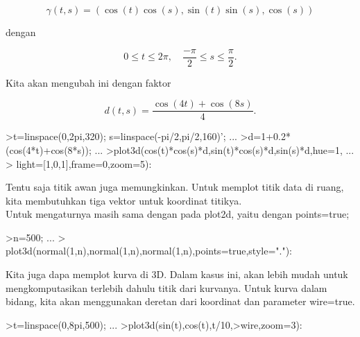 \documentclass{article}
\begin{document}
\begin{eulernotebook}
\begin{eulercomment}
\end{eulercomment}
\begin{eulerformula}
\[
\gamma(t,s) = (\cos(t)\cos(s),\sin(t)\sin(s),\cos(s))
\]
\end{eulerformula}
\begin{eulercomment}
dengan

\end{eulercomment}
\begin{eulerformula}
\[
0 \le t \le 2\pi, \quad \frac{-\pi}{2} \le s \le \frac{\pi}{2}.
\]
\end{eulerformula}
\begin{eulercomment}
Kita akan mengubah ini dengan faktor

\end{eulercomment}
\begin{eulerformula}
\[
d(t,s) = \frac{\cos(4t)+\cos(8s)}{4}.
\]
\end{eulerformula}
\begin{eulerprompt}
>t=linspace(0,2pi,320); s=linspace(-pi/2,pi/2,160)'; ...
>d=1+0.2*(cos(4*t)+cos(8*s)); ...
>plot3d(cos(t)*cos(s)*d,sin(t)*cos(s)*d,sin(s)*d,hue=1, ...
>  light=[1,0,1],frame=0,zoom=5):
\end{eulerprompt}
\begin{eulercomment}
Tentu saja titik awan juga memungkinkan. Untuk memplot titik data di
ruang, kita membutuhkan tiga vektor untuk koordinat titikya.\\
Untuk mengaturnya masih sama dengan pada plot2d, yaitu dengan
points=true;
\end{eulercomment}
\begin{eulerprompt}
>n=500;  ...
>  plot3d(normal(1,n),normal(1,n),normal(1,n),points=true,style="."):
\end{eulerprompt}
\begin{eulercomment}
Kita juga dapa memplot kurva di 3D. Dalam kasus ini, akan lebih mudah
untuk mengkomputasikan terlebih dahulu titik dari kurvanya. Untuk
kurva dalam bidang, kita akan menggunakan deretan dari koordinat dan
parameter wire=true.
\end{eulercomment}
\begin{eulerprompt}
>t=linspace(0,8pi,500); ...
>plot3d(sin(t),cos(t),t/10,>wire,zoom=3):
\end{eulerprompt}

\end{eulernotebook}
\end{document}
